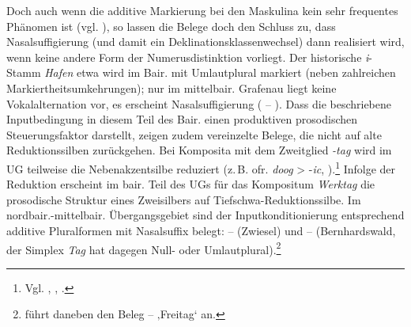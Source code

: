 Doch auch wenn die additive Markierung bei den Maskulina kein sehr frequentes Phänomen ist (vgl. ), so lassen die Belege doch den Schluss zu, dass Nasalsuffigierung (und damit ein Deklinationsklassenwechsel) dann realisiert wird, wenn keine andere Form der Numerusdistinktion vorliegt. Der historische \textit{i}{}-Stamm \textit{Hafen} etwa wird im Bair. mit Umlautplural markiert (neben zahlreichen Markiertheitsumkehrungen); nur im mittelbair. Grafenau liegt keine Vokalalternation vor, es erscheint Nasalsuffigierung ( -- ). Dass die beschriebene Inputbedingung in diesem Teil des Bair. einen produktiven prosodischen Steuerungsfaktor darstellt, zeigen zudem vereinzelte Belege, die nicht auf alte Reduktionssilben zurückgehen. Bei Komposita mit dem Zweitglied \textit{{}-tag} wird im UG teilweise die Nebenakzentsilbe reduziert (z.\,B. ofr. \textit{doog} > \mbox{-\textit{ic}}, \citealt[338]{Schmidt1905}).\footnote{Vgl. \citet[22--23]{Köhler1934}, \citet[Karte 12]{Roth1940}, \citet[15]{Schießl1909}.} Infolge der Reduktion erscheint im bair. Teil des UGs für das Kompositum \textit{Werktag} die prosodische Struktur eines Zweisilbers auf Tiefschwa-Reduktionssilbe. Im nordbair.-mittelbair. Übergangsgebiet sind der Inputkonditionierung entsprechend additive Pluralformen mit Nasalsuffix belegt:  --  (Zwiesel) und  --  (Bern\-hards\-wald, der Simplex \textit{Tag} hat dagegen Null- oder Umlautplural).\footnote{\citet[422]{Schirmunski1962} führt daneben den Beleg  --  ‚Freitag‘ an.}



